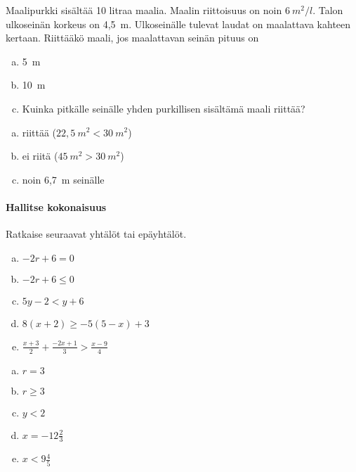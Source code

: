 \begin{tehtavasivu}
\begin{tehtava}
Maalipurkki sisältää 10 litraa maalia. Maalin riittoisuus on noin $6~m^2/l$. Talon ulkoseinän korkeus on 4,5~m. Ulkoseinälle tulevat laudat on maalattava kahteen kertaan. Riittääkö maali, jos maalattavan seinän pituus on
	\begin{enumerate}[a)]
		\item 5~m
		\item 10~m
		\item Kuinka pitkälle seinälle yhden purkillisen sisältämä maali riittää?
	\end{enumerate}
	\begin{vastaus}
		\begin{enumerate}[a)]
			\item riittää ($22,5~m^2 < 30~m^2$)
			\item ei riitä ($45~m^2 > 30~m^2$)
			\item noin 6,7~m seinälle
		\end{enumerate}

	\end{vastaus}
\end{tehtava}



\paragraph*{Hallitse kokonaisuus}

\begin{tehtava}
    Ratkaise seuraavat yhtälöt tai epäyhtälöt.
    \begin{enumerate}[a)]
        \item $-2r+6=0$
        \item $-2r+6\leq 0$
        \item $5y-2<y+6$
        \item $8(x+2)\geq -5(5-x)+3$
        \item $\frac{x+3}{2}+\frac{-2x+1}{3}>\frac{x-9}{4}$
    \end{enumerate}
    \begin{vastaus}
        \begin{enumerate}[a)]
            \item $r=3$
            \item $r\geq 3$
            \item $y<2$
            \item $x=-12\frac{2}{3}$
            \item $x<9\frac{4}{5}$
        \end{enumerate}
    \end{vastaus}
\end{tehtava}


\end{tehtavasivu}
